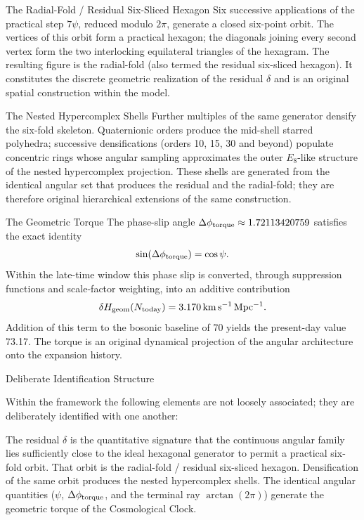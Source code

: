 The Radial-Fold / Residual Six-Sliced Hexagon  
   Six successive applications of the practical step \(7\psi\), reduced modulo \(2\pi\), generate a closed six-point orbit. The vertices of this orbit form a practical hexagon; the diagonals joining every second vertex form the two interlocking equilateral triangles of the hexagram. The resulting figure is the radial-fold (also termed the residual six-sliced hexagon). It constitutes the discrete geometric realization of the residual \(\delta\) and is an original spatial construction within the model.

The Nested Hypercomplex Shells  
   Further multiples of the same generator densify the six-fold skeleton. Quaternionic orders produce the mid-shell starred polyhedra; successive densifications (orders 10, 15, 30 and beyond) populate concentric rings whose angular sampling approximates the outer \(E_8\)-like structure of the nested hypercomplex projection. These shells are generated from the identical angular set that produces the residual and the radial-fold; they are therefore original hierarchical extensions of the same construction.

The Geometric Torque  
   The phase-slip angle \(\Delta\phi_{\rm torque} \approx 1.72113420759\) satisfies the exact identity  
   \[
   \sin(\Delta\phi_{\rm torque}) = \cos\psi.
   \]  
   Within the late-time window this phase slip is converted, through suppression functions and scale-factor weighting, into an additive contribution  
   \[
   \delta H_{\rm geom}(N_{\rm today}) = 3.170\,\mathrm{km\,s^{-1}\,Mpc^{-1}}.
   \]  
   Addition of this term to the bosonic baseline of 70 yields the present-day value 73.17. The torque is an original dynamical projection of the angular architecture onto the expansion history.

Deliberate Identification Structure

Within the framework the following elements are not loosely associated; they are deliberately identified with one another:

The residual \(\delta\) is the quantitative signature that the continuous angular family lies sufficiently close to the ideal hexagonal generator to permit a practical six-fold orbit.  
That orbit is the radial-fold / residual six-sliced hexagon.  
Densification of the same orbit produces the nested hypercomplex shells.  
The identical angular quantities (\(\psi\), \(\Delta\phi_{\rm torque}\), and the terminal ray \(\arctan(2\pi)\)) generate the geometric torque of the Cosmological Clock.  

